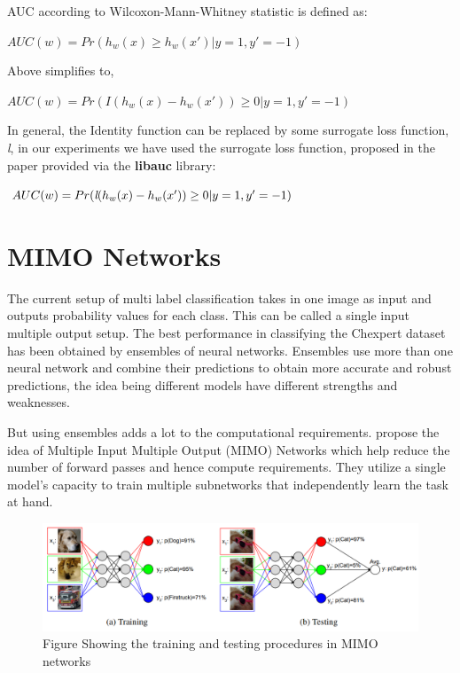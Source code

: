 AUC according to Wilcoxon-Mann-Whitney statistic is defined as:
\begin{center}
{\textbf{$AUC(w) = Pr(h_w(x) \geq h_w(x')|y = 1, y' = -1)$}}
\end{center}
Above simplifies to, 
\begin{center}
{\textbf{$AUC(w) = Pr(I(h_w(x) - h_w(x'))\geq 0|y = 1, y' = -1)$}}
\end{center}
In general, the Identity function can be replaced by some surrogate loss function, \emph{l}, in our experiments we have used the surrogate loss function, proposed in the paper \cite{yuan2021large} provided via the \textbf{libauc} library:
\begin{center}
{\textbf{$AUC(w) = Pr(\emph{l}(h_w(x) - h_w(x'))\geq 0|y = 1, y' = -1)$}}
\end{center}
\section{MIMO Networks}

The current setup of multi label classification takes in one image as input and outputs probability values for each class. This can be called a single input multiple output setup. The best performance in classifying the Chexpert dataset has been obtained by ensembles of neural networks. Ensembles use more than one neural network and combine their predictions to obtain more accurate and robust predictions, the idea being different models have different strengths and weaknesses.

But using ensembles adds a lot to the computational requirements. \cite{havasi2021training} propose the idea of Multiple Input Multiple Output (MIMO) Networks which help reduce the number of forward passes and hence compute requirements. They utilize a single model’s capacity to train multiple subnetworks that independently learn the task at hand.

\begin{figure}[!htbp]
  \begin{center}
    \leavevmode
    \ifpdf
      \includegraphics[scale=0.5]
      {Chapter2/Chapter2Figs/mimo.png}    
    \fi
    \caption{Figure Showing the training and testing procedures in MIMO networks}
    \label{mimo}
  \end{center}
\end{figure}

